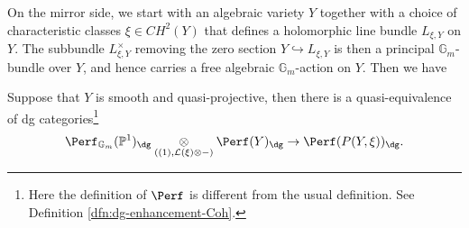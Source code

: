 On the mirror side, we start with an algebraic variety $Y$ together with a choice of characteristic classes $\xi\in CH^2 (Y)$ that defines a holomorphic line bundle $L_{\xi, Y}$ on $Y$. The subbundle $L_{\xi,Y}^{\times}$ removing the zero section $Y\hookrightarrow L_{\xi, Y}$ is then a principal $\mathbb{G}_m$-bundle over $Y$, and hence carries a free algebraic $\mathbb{G}_m$-action on $Y$. Then we have
\begin{thm}\label{thm:twisted-tensor-P1-bundle}
    Suppose that $Y$ is smooth and quasi-projective, then there is a quasi-equivalence of dg categories\footnote{Here the definition of $\Perf$ is different from the usual definition. See Definition \ref{dfn:dg-enhancement-Coh}.}
$$
\Perf_{\mathbb{G}_m}(\mathbb{P}^1)_{\dg}
\underset{((1),\mathcal{L}(\xi)\otimes-)}{\otimes}
\Perf(Y)_{\dg}
\rightarrow
\Perf(P(Y,\xi))_{\dg}.
$$
\end{thm}

